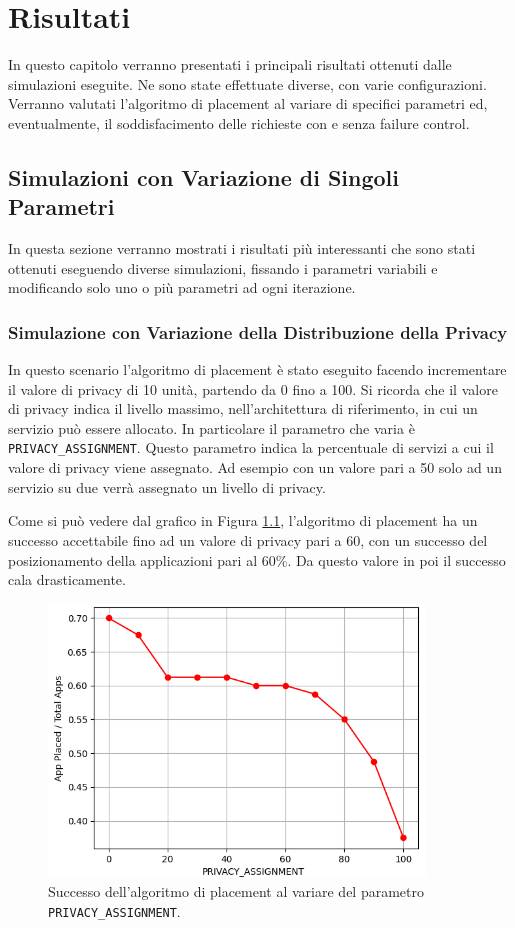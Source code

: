 \chapter{Risultati}

In questo capitolo verranno presentati i principali risultati ottenuti dalle simulazioni eseguite. Ne sono state effettuate diverse, con varie configurazioni. Verranno valutati l'algoritmo di placement al variare di specifici parametri ed, eventualmente, il soddisfacimento delle richieste con e senza failure control.

\section{Simulazioni con Variazione di Singoli Parametri}

In questa sezione verranno mostrati i risultati più interessanti che sono stati ottenuti eseguendo diverse simulazioni, fissando i parametri variabili e modificando solo uno o più parametri ad ogni iterazione.

\subsection{Simulazione con Variazione della Distribuzione della Privacy}

In questo scenario l'algoritmo di placement è stato eseguito facendo incrementare il valore di privacy di 10 unità, partendo da 0 fino a 100. Si ricorda che il valore di privacy indica il livello massimo, nell'architettura di riferimento, in cui un servizio può essere allocato. In particolare il parametro che varia è \texttt{PRIVACY\_ASSIGNMENT}. Questo parametro indica la percentuale di servizi a cui il valore di privacy viene assegnato. Ad esempio con un valore pari a 50 solo ad un servizio su due verrà assegnato un livello di privacy.

Come si può vedere dal grafico in Figura \ref{fig:privacy_placement_success}, l'algoritmo di placement ha un successo accettabile fino ad un valore di privacy pari a 60, con un successo del posizionamento della applicazioni pari al $60\%$. Da questo valore in poi il successo cala drasticamente.

\begin{figure}[!ht]
  \includegraphics[width=10cm]{images/privacy_placement_success}
  \centering
  \caption{Successo dell'algoritmo di placement al variare del parametro \texttt{PRIVACY\_ASSIGNMENT}.}
  \label{fig:privacy_placement_success}
\end{figure}

